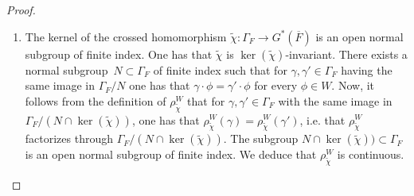 \documentclass[a4paper,english,12pt]{amsart}
\newcommand{\oF}{\overline F}
\newcommand{\wchi}{\widetilde{\chi}}
\numberwithin{equation}{subsection}
\begin{document}
\begin{proof}
\begin{enumerate}
\item The kernel of the crossed homomorphism $\widetilde\chi:\Gamma_F\to G^*(\oF)$ is an open normal subgroup of finite index. %
One has that $\widetilde\chi$ is $\ker (\widetilde\chi)$-invariant. %
 There exists a normal subgroup~$N\subset\Gamma_F$ of finite index such that for $\gamma,\gamma'\in\Gamma_F$ having the same image in $\Gamma_F/N$ one has that $\gamma\cdot \phi=\gamma'\cdot \phi$ for every $\phi\in W$.  Now, it follows from the definition of $\rho^W_{\wchi}$ that for $\gamma,\gamma'\in \Gamma_F$ with the same image in $\Gamma_F/( N\cap\ker (\widetilde\chi))$, one has that $\rho^W_{\wchi}(\gamma)=\rho^W_{\wchi}(\gamma')$, i.e. that $\rho^W_{\wchi}$ factorizes through $\Gamma_F/( N\cap\ker (\widetilde\chi))$. The subgroup $N\cap\ker (\widetilde\chi))\subset\Gamma_F$ is an open normal subgroup of finite index. We deduce that $\rho^W_{\wchi}$ is continuous.

\end{enumerate}
\end{proof}
\end{document}
